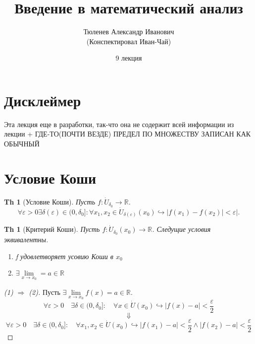 \documentclass[a5paper, 10pt]{article}
\theoremstyle{plain}
\newtheorem{theorem}{Th}
\newtheorem*{theorem_}{Th}
\newcommand{\R}{\mathbb R}
\newcommand{\eps}{\varepsilon}
\newcommand{\hrarrow}{\hookrightarrow}
\newcommand{\Rarrow}{\Rightarrow}
\begin{document}
	\author{Тюленев Александр Иванович\\(Конспектировал Иван-Чай)}
	\date{9 лекция}
	\title{Введение в математический анализ}

	\linespread{1.4}
	\selectfont

	\maketitle
	\newpage

	\tableofcontents

    \section{Дисклеймер}

    Эта лекция еще в разработки, так-что она не содержит всей информации из лекции + \newline
    ГДЕ-ТО(ПОЧТИ ВЕЗДЕ) ПРЕДЕЛ ПО МНОЖЕСТВУ ЗАПИСАН КАК ОБЫЧНЫЙ

    \section{Условие Коши}


    \begin{theorem}[Условие Коши]
        Пусть $ f: \dot{U}_{\delta_0} \to \R $.
        \[
            \forall \eps > 0 \exists \delta(\eps) \in (0, \delta_0]: \forall x_1, x_2 \in \dot{U}_{\delta(\eps)}(x_0) \hrarrow |f(x_1) - f(x_2)| < \eps |
        .\]
    \end{theorem}
    \begin{theorem_}[Критерий Коши]
        Пусть $ f: \dot{U}_{\delta_0}(x_0) \to \R $.
        Следущие условия эквивалентны.
        \begin{enumerate}
            \item f удовлетворяет усовию Коши в $ x_0 $
            \item $ \exists \lim\limits_{x \to x_0} = a \in \R $
        \end{enumerate}
    \end{theorem_}

    \begin{proof}[(1) $ \Rarrow $ (2)]
        Пусть $ \exists \lim\limits_{x \to x_0} f(x) = a \in \R $.
        \[ \forall \eps > 0 \quad \exists \delta \in (0, \delta_0]: \quad \forall x \in \dot{U}(x_0) \hrarrow |f(x) - a| < \frac{\eps}{2} \]
        \[ \Downarrow \]
        \[ \forall \eps > 0 \quad \exists \delta \in (0, \delta_0]: \quad \forall x_1, x_2 \in \dot{U}(x_0) \hrarrow
            |f(x_1) - a| < \frac{\eps}{2} \land
            |f(x_2) - a| < \frac{\eps}{2} \]
    \end{proof}
\end{document}
